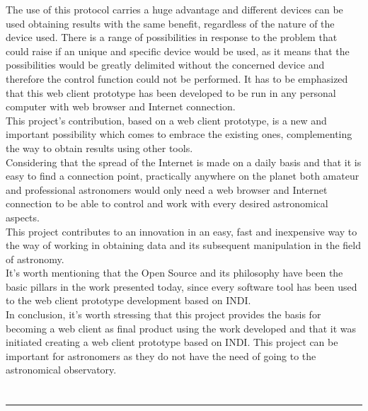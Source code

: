 The use of this protocol carries a huge advantage and different devices can be used obtaining results with the same benefit, regardless of the nature of the device used. There is a range of possibilities in response to the problem that could raise if an unique and specific device would be used, as it means that the possibilities would be greatly delimited without the concerned  device and therefore the control function could not be performed. It has to be emphasized that this web client prototype has been developed to be run in any personal computer with web browser and Internet connection.\\

This project’s contribution, based on a web client prototype, is a new and important possibility which comes to embrace the existing ones, complementing the way to obtain results using other tools.\\

Considering that the spread of the Internet is made on a daily basis and that it is easy to find a connection point, practically anywhere on the planet both amateur and professional astronomers would only need a web browser and Internet connection to be able to control and work with every desired astronomical aspects.\\

This project contributes to an innovation in an easy, fast and inexpensive way to the way of working in obtaining data and its subsequent manipulation in the field of astronomy.\\

It’s worth mentioning that the Open Source and its philosophy have been the basic pillars in the work presented today,  since every software tool has been used to the web client prototype development based on INDI.\\

In conclusion, it’s worth stressing that this project provides the basis for becoming a web client as final product using the work developed and that it was initiated creating a web client prototype based on INDI. This project can be important for astronomers as they do not have the need of going to the astronomical observatory.

\chapter*{}
\thispagestyle{empty}

\noindent\rule[-1ex]{\textwidth}{2pt}\\[4.5ex]

